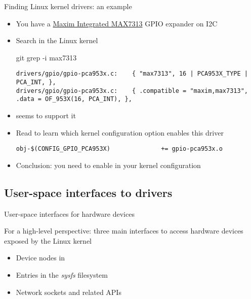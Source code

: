\begin{frame}[fragile]{Finding Linux kernel drivers: an example}
  \begin{itemize}
  \item You have a
    \href{https://www.maximintegrated.com/en/products/interface/controllers-expanders/MAX7313.html}{Maxim
      Integrated MAX7313} GPIO expander on I2C
  \item Search in the Linux kernel
    \begin{block}{git grep -i max7313}
      {\tiny
\begin{verbatim}
drivers/gpio/gpio-pca953x.c:    { "max7313", 16 | PCA953X_TYPE | PCA_INT, },
drivers/gpio/gpio-pca953x.c:    { .compatible = "maxim,max7313", .data = OF_953X(16, PCA_INT), },
\end{verbatim}
      }
    \end{block}
  \item {} seems to support it
  \item Read  to learn which kernel
    configuration option enables this driver
    \begin{block}{}
      {\tiny
\begin{verbatim}
obj-$(CONFIG_GPIO_PCA953X)              += gpio-pca953x.o
\end{verbatim}
      }
    \end{block}
  \item Conclusion: you need to enable  in
    your kernel configuration
  \end{itemize}
\end{frame}

\subsection{User-space interfaces to drivers}

\begin{frame}{User-space interfaces for hardware devices}

  For a high-level perspective: three main interfaces to access
  hardware devices exposed by the Linux kernel

  \begin{itemize}
  \item Device nodes in 
  \item Entries in the {\em sysfs} filesystem
  \item Network sockets and related APIs
  \end{itemize}
\end{frame}

